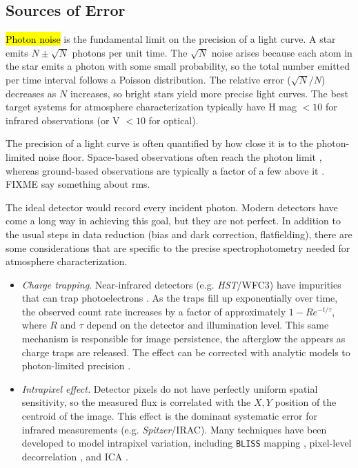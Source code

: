 \documentclass[graybox,natbib,nosecnum]{svmult}
\newcommand{\hbindex}[1]{\hl{#1}\index{#1}}  %
\newcommand{\project}[1]{\textsl{#1}}
\newcommand{\HST}{\project{HST}}
\newcommand{\Spitzer}{\project{Spitzer}}
\begin{document}
\subsection{Sources of Error}

\hbindex{Photon noise} is the fundamental limit on the precision of a light curve. A star emits $N \pm \sqrt{N}$ photons per unit time. The $\sqrt{N}$ noise arises because each atom in the star emits a photon with some small probability, so the total number emitted per time interval follows a Poisson distribution. The relative error ($\sqrt{N}/N$) decreases as $N$ increases, so bright stars yield more precise light curves.  The best target systems for atmosphere characterization typically have H mag $< 10$ for infrared observations (or V $< 10$ for optical).  

The precision of a light curve is often quantified by how close it is to the photon-limited noise floor. Space-based observations often reach the photon limit \citep{sing11, kreidberg14a, ingalls16}, whereas ground-based observations are typically a factor of a few above it \citep[e.g.][]{bean13}. FIXME say something about rms.

The ideal detector would record every incident photon.  Modern detectors have come a long way in achieving this goal, but they are not perfect.  In addition to the usual steps in data reduction (bias and dark correction, flatfielding), there are some considerations that are specific to the precise spectrophotometry needed for atmosphere characterization.

\begin{itemize}
\item{\emph{Charge trapping}. Near-infrared detectors (e.g. \HST/WFC3) have impurities that can trap photoelectrons \citep{smith08}. As the traps fill up exponentially over time, the observed count rate increases by a factor of approximately $1 - R e^{-t/\tau}$, where $R$ and $\tau$ depend on the detector and illumination level.  This same mechanism is responsible for image persistence, the afterglow the appears as charge traps are released. The effect can be corrected with analytic models to photon-limited precision \citep{deming13, line16}. 
}
\item{\emph{Intrapixel effect.} Detector pixels do not have perfectly uniform spatial sensitivity, so the measured flux is correlated with the $X, Y$ position of the centroid of the image. This effect is the dominant systematic error for infrared measurements (e.g. \Spitzer/IRAC). Many techniques have been developed to model intrapixel variation, including \texttt{BLISS} mapping \citep{stevenson12}, pixel-level decorrelation \citep{deming15}, and ICA \citep{morello15}.}
\end{itemize}
\end{document}
